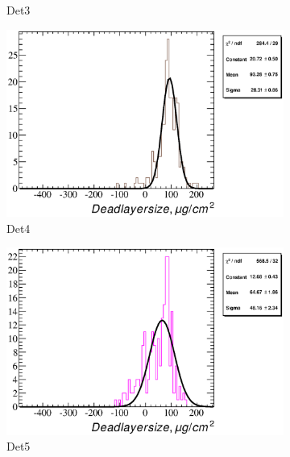 \documentclass[a4paper,12pt]{article}
\begin{document}
\begin{figure}
\begin{subfigure}[b]{0.325\textwidth}
\caption{Det3}
\end{subfigure}
\begin{subfigure}[b]{0.325\textwidth}
\includegraphics[width=\textwidth]{gfx/run13_alpha_study_novoltagevariation/Y2U/c_hDeadLayerSize_by_run_distribution4_Y2U.eps}
\caption{Det4}
\end{subfigure}
\hfill
\begin{subfigure}[b]{0.325\textwidth}
\includegraphics[width=\textwidth]{gfx/run13_alpha_study_novoltagevariation/Y2U/c_hDeadLayerSize_by_run_distribution5_Y2U.eps}
\caption{Det5}
\end{subfigure}
\hfill
\begin{subfigure}[b]{0.325\textwidth}

\end{subfigure}
\end{figure}
\end{document}
